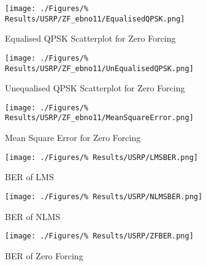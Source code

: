 \begin{figure}[ht]
	\texttt{[image: ./Figures/\%
	Results/USRP/ZF\_ebno11/EqualisedQPSK.png]}
	\caption{Equalised QPSK Scatterplot for Zero 
	Forcing}
\end{figure}
\begin{figure}[ht]
	\texttt{[image: ./Figures/\%
	Results/USRP/ZF\_ebno11/UnEqualisedQPSK.png]}
	\caption{Unequalised QPSK Scatterplot for Zero 
	Forcing}
\end{figure}
\begin{figure}[ht]
	\texttt{[image: ./Figures/\%
	Results/USRP/ZF\_ebno11/MeanSquareError.png]}
	\caption{Mean Square Error for Zero Forcing}
\end{figure}

\begin{figure}[ht]
	\texttt{[image: ./Figures/\%
	Results/USRP/LMSBER.png]}
	\caption{BER of LMS}
\end{figure}
\begin{figure}[ht]
	\texttt{[image: ./Figures/\%
	Results/USRP/NLMSBER.png]}
	\caption{BER of NLMS}
	\label{fig:NLMS-BER-USRP}
\end{figure}
\begin{figure}[ht]
	\texttt{[image: ./Figures/\%
	Results/USRP/ZFBER.png]}
	\caption{BER of Zero Forcing}
\end{figure}

	

